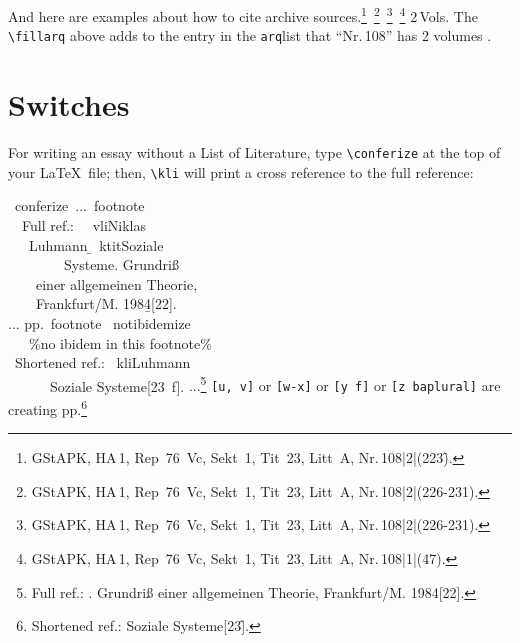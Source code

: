 \documentclass[12pt,a4paper]{article}
\newcommand{\pbs}{\string\ \unskip}
\newcommand{\bs}{\protect\pbs}
\renewcommand{\{}{{\normalfont\lbashortmem}}
\renewcommand{\}}{{\normalfont\rbashortmem}}
\let\mempage=\thepage
\renewcommand{\thepage}{\textit{\bapageframe{\roman{page}}}}
\begin{document}
  \vspace{1ex}\noindent
  And here are examples about how to cite archive 
  sources.\footnote{
  {GStAPK, HA\,1, Rep~76~Vc, Sekt~1, Tit~23, Litt~A, Nr.\,108}|2|(223\f).}\,%
  \footnote{
  {GStAPK, HA\,1, Rep~76~Vc, Sekt~1, Tit~23,
  Litt~A, Nr.\,108}|2|(226-231).}\,%
  \footnote{
  {GStAPK, HA\,1, Rep~76~Vc, Sekt~1, Tit~23,
  Litt~A, Nr.\,108}|2|(226-231).}\,%
  \footnote{ 
  {GStAPK, HA\,1, Rep~76~Vc, Sekt~1, Tit~23, 
  Litt~A, Nr.\,108}|1|(47).} 
         {2\,Vols.}
  The \verb|\fillarq| above adds to the entry in the
  \texttt{arq}\hy list that ``Nr.\,108'' has 2 volumes . 
  

\newpage
\renewcommand{\thepage}{\mempage}
\setcounter{page}{1}
\setcounter{footnote}{0}
\section{Switches}
 For writing an essay without a List of Literature, type \verb|\conferize|
 at the top of your \LaTeX\ file; then, \verb|\kli| will print a cross\hy 
 reference to the full reference:

 \Doppelbox
 {\bs conferize\ ...\bs footnote\{
  \\[.15ex] \ \ Full ref.: \ \bs vli\{Niklas\} 
  \\[.05ex] \ \ \ \{Luhmann\} \b{\{}\bs ktit\{Soziale 
  \\[.15ex] \ \ \ \ \ \ \ \ Systeme\}. Grundriß 
  \\ \ \ \ \ einer allgemeinen Theorie, 
  \\ \ \ \ \ Frankfurt/M. 1984\b{\}}[22].\}
  \\[1.5ex] ... pp.\bs footnote\{ \bs notibidemize
  \\ \ \ \ \%no ibidem in this footnote\%
  \\ \ Shortened ref.: \bs kli\{Luhmann\} 
  \\ \ \ \ \ \ \ \{Soziale Systeme\}[23\bs f].\}
 }
 {\conferize ...\footnote{
        Full ref.:  {. 
        Grundriß einer allgemeinen Theorie, Frankfurt/M. 1984}[22].} 
  \texttt{[u, v]} or \texttt{[w-x]} or \texttt{[y\bs f]} or 
          \texttt{[z\bs baplural]} are creating pp.\footnote{\notibidemize 
       Shortened ref.:  {Soziale Systeme}[23\f].}
 }
\end{document}
